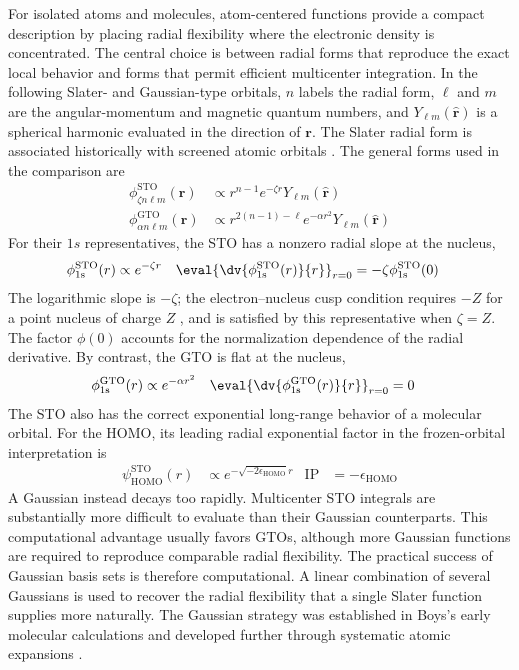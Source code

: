 \documentclass[11pt,a4paper,titlepage]{article}
\numberwithin{equation}{section}
\newcommand{\br}{\boldsymbol{r}}
\begin{document}
For isolated atoms and molecules, atom-centered functions provide a compact
description by placing radial flexibility where the electronic density is
concentrated. The central choice is between radial forms that reproduce the
exact local behavior and forms that permit efficient multicenter integration.
In the following Slater- and Gaussian-type orbitals, $n$ labels the radial
form, $\ell$ and $m$ are the angular-momentum and magnetic quantum numbers,
and $Y_{\ell m}(\hat{\br})$ is a spherical harmonic evaluated in the direction
of $\br$. The Slater radial form is associated historically with screened atomic
orbitals \citep{Slater1930Orbitals}. The general forms used in the comparison are
\begin{equation}
\begin{split}
  \phi_{\zeta n\ell m}^\text{STO}(\br)
 &\propto r^{n-1}e^{-\zeta r}Y_{\ell m}(\hat{\br})
  \\
  \phi_{\alpha n\ell m}^\text{GTO}(\br)
 &\propto r^{2(n-1)-\ell}e^{-\alpha r^2}Y_{\ell m}(\hat{\br})
\end{split}
\end{equation}
For their $1s$ representatives, the STO has a nonzero radial slope at the nucleus,
\begin{align}
  \phi_\text{1s}^\text{STO}(r)&\propto e^{-\zeta r}
  &
  \eval{\dv{\phi_\text{1s}^\text{STO}(r)}{r}}_{r=0}
 &=-\zeta\phi_\text{1s}^\text{STO}(0)
\end{align}
The logarithmic slope is $-\zeta$; the electron--nucleus cusp condition
requires $-Z$ for a point nucleus of charge $Z$ \citep{Kato1957}, and is satisfied by this
representative when $\zeta=Z$. The factor $\phi(0)$ accounts for the
normalization dependence of the radial derivative.
By contrast, the GTO is flat at the nucleus,
\begin{align}
  \phi_\text{1s}^\text{GTO}(r)&\propto e^{-\alpha r^2}
  &
  \eval{\dv{\phi_\text{1s}^\text{GTO}(r)}{r}}_{r=0}&=0
\end{align}
The STO also has the correct exponential long-range behavior of a molecular
orbital. For the HOMO, its leading radial exponential factor in the
frozen-orbital interpretation is
\begin{align}
  \psi_\text{HOMO}^\text{STO}(r)
 &\propto e^{-\sqrt{-2\epsilon_\text{HOMO}}r}
  &
  \mathrm{IP}&=-\epsilon_\text{HOMO}
\end{align}
A Gaussian instead decays too rapidly. Multicenter STO integrals are
substantially more difficult to evaluate than their Gaussian counterparts.
This computational advantage usually favors GTOs, although more Gaussian
functions are required to reproduce comparable radial flexibility.
The practical success of Gaussian basis sets is therefore computational. A
linear combination of several Gaussians is used to recover the radial
flexibility that a single Slater function supplies more naturally. The
Gaussian strategy was established in Boys's early molecular calculations
and developed further through systematic atomic expansions
\citep{Boys1950,Huzinaga1965}.
\end{document}
